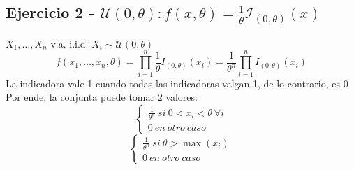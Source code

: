 \documentclass[a4paper]{article}
\begin{document}
\subsection{Ejercicio 2 - $\mathcal{U}(0,\theta):f(x,\theta) = \frac{1}{\theta}\mathcal{I}_{(0,\theta)}(x)$}
$X_{1},\dots,X_{n}$ v.a. i.i.d. $X_{i} \sim \mathcal{U}(0,\theta)$
\begin{equation*}
    f(x_{1},\dots,x_{n}, \theta) = \prod_{i=1}^n \frac{1}{\theta}I_{(0,\theta)}(x_{i}) = \frac{1}{\theta^n}\prod_{i=1}^n I_{(0,\theta)}(x_{i})
\end{equation*}
La indicadora vale 1 cuando todas las indicadoras valgan 1, de lo contrario, es 0
Por ende, la conjunta puede tomar 2 valores:
\begin{equation*}
    \begin{cases}
        \frac{1}{\theta^n} \ si \ 0<x_{i}<\theta \  \forall i
        \\
        0 \ en \ otro \ caso
        \end{cases}
\end{equation*}
\begin{equation*}
    \begin{cases}
        \frac{1}{\theta^n} \ si \ \theta > \max(x_{i})
        \\
        0 \ en \ otro \ caso
        \end{cases}
\end{equation*}
\end{document}
